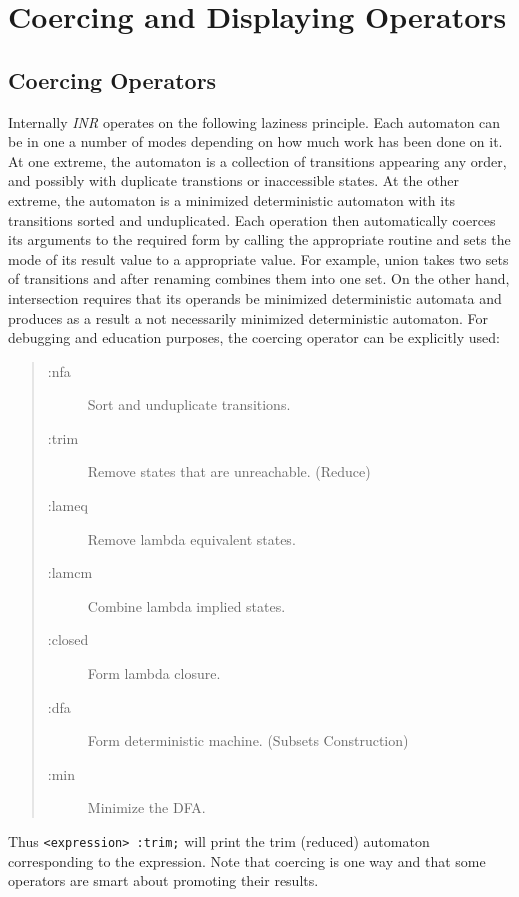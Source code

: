 \section{Coercing and Displaying Operators}
\subsection{Coercing Operators}
Internally {\em INR} operates on the following laziness principle.
Each automaton can be in one a number of modes depending on how much work
has been done on it.
At one extreme, the automaton is a collection of transitions appearing any
order, and possibly with duplicate transtions or inaccessible states.
At the other extreme, the automaton is a minimized deterministic automaton
with its transitions sorted and unduplicated.
Each operation then automatically coerces its arguments to the required
form by calling the appropriate routine and sets the mode of its result
value to a appropriate value.
For example, union takes two sets of transitions and after renaming
combines them into one set.
On the other hand, intersection requires that its operands be minimized
deterministic automata and produces as a result a not necessarily minimized
deterministic automaton.
For debugging and education purposes, the coercing operator can be
explicitly used:
\begin{quote}
\begin{description}
\item[:nfa] Sort and unduplicate transitions.
\item[:trim] Remove states that are unreachable. (Reduce)
\item[:lameq] Remove lambda equivalent states.
\item[:lamcm] Combine lambda implied states.
\item[:closed] Form lambda closure.
\item[:dfa] Form deterministic machine. (Subsets Construction)
\item[:min] Minimize the DFA.
\end{description}
\end{quote}
Thus \verb#<expression> :trim;#
will print the trim (reduced) automaton corresponding to the expression.
Note that coercing is one way and that some operators are smart about
promoting their results.
